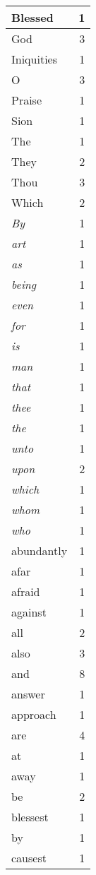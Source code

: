\begin{center}
\begin{longtable}{l|r}
\hline \hline
\endlastfoot
Blessed & 1 \\ \hline
God & 3 \\ \hline
Iniquities & 1 \\ \hline
O & 3 \\ \hline
Praise & 1 \\ \hline
Sion & 1 \\ \hline
The & 1 \\ \hline
They & 2 \\ \hline
Thou & 3 \\ \hline
Which & 2 \\ \hline
\emph{By} & 1 \\ \hline
\emph{art} & 1 \\ \hline
\emph{as} & 1 \\ \hline
\emph{being} & 1 \\ \hline
\emph{even} & 1 \\ \hline
\emph{for} & 1 \\ \hline
\emph{is} & 1 \\ \hline
\emph{man} & 1 \\ \hline
\emph{that} & 1 \\ \hline
\emph{thee} & 1 \\ \hline
\emph{the} & 1 \\ \hline
\emph{unto} & 1 \\ \hline
\emph{upon} & 2 \\ \hline
\emph{which} & 1 \\ \hline
\emph{whom} & 1 \\ \hline
\emph{who} & 1 \\ \hline
abundantly & 1 \\ \hline
afar & 1 \\ \hline
afraid & 1 \\ \hline
against & 1 \\ \hline
all & 2 \\ \hline
also & 3 \\ \hline
and & 8 \\ \hline
answer & 1 \\ \hline
approach & 1 \\ \hline
are & 4 \\ \hline
at & 1 \\ \hline
away & 1 \\ \hline
be & 2 \\ \hline
blessest & 1 \\ \hline
by & 1 \\ \hline
causest & 1 \\ \hline

\end{longtable}
\end{center}
